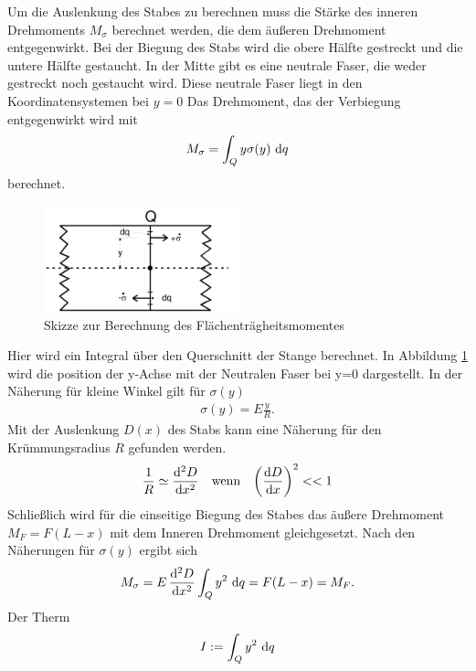 Um die Auslenkung des Stabes zu berechnen muss die Stärke des inneren Drehmoments $M_\sigma$ berechnet werden, 
die dem äußeren Drehmoment entgegenwirkt.
Bei der Biegung des Stabs wird die obere Hälfte gestreckt und die untere Hälfte gestaucht.
In der Mitte gibt es eine neutrale Faser, die weder gestreckt noch gestaucht wird.
Diese neutrale Faser liegt in den Koordinatensystemen bei $y = 0$ 
Das Drehmoment, das der Verbiegung entgegenwirkt wird mit 
\begin{align}
    M_\sigma = \int_{Q}^{} y \sigma(y) \,\mathop{}\!\mathrm{d} q 
    \label{eq:inneres_Moment_int}
\end{align}
berechnet.
\begin{figure}[H]
    \centering
    \includegraphics[width = 0.5\textwidth]{Abbildungen/Biegungsintegral.png}
    \caption{Skizze zur Berechnung des Flächenträgheitsmomentes \cite{man:v103}}
    \label{fig:Biegungsintegral}
\end{figure}
Hier wird ein Integral über den Querschnitt der Stange berechnet.
In Abbildung \ref{fig:Biegungsintegral} wird die position der y-Achse mit der Neutralen Faser bei y=0
 dargestellt.
In der Näherung für kleine Winkel gilt für $\sigma(y)$
\begin{align*}
    \sigma(y) = E \frac{y}{R} .
\end{align*}
Mit der Auslenkung $D(x)$ des Stabs kann eine Näherung für den Krümmungsradius $R$ gefunden werden.
\begin{align*}
    \frac{1}{R} &\simeq  \frac{\mathop{}\!\mathrm{d}^2 D}{\mathop{}\!\mathrm{d} x^2} & &\text{wenn} & \left(\frac{\mathop{}\!\mathrm{d} D}{\mathop{}\!\mathrm{d} x}\right)^2 << 1 
\end{align*}
Schließlich wird für die einseitige Biegung des Stabes das äußere Drehmoment $M_F = F(L - x)$ mit dem Inneren Drehmoment gleichgesetzt.
Nach den Näherungen für $\sigma(y)$ ergibt sich
\begin{align}
    M_\sigma = E \, \frac{\diff^2 D}{\diff x^2} \int_{Q} y^2 \,\diff q = F (L - x) = M_F  . %
    \label{eq:Momentengleichung_einseitig}
\end{align}
Der Therm 
\begin{align}
    I := \int_{Q} y^2 \,\mathop{}\!\mathrm{d} q
\end{align} 
